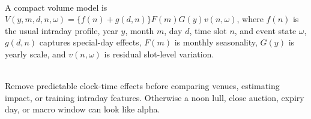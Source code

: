 \begin{model} \\
A compact volume model is $V(y,m,d,n,\omega)=\{f(n)+g(d,n)\}F(m)G(y)v(n,\omega)$, where 
$f(n)$ is the usual intraday profile, year $y$, month $m$, day $d$, time slot $n$, and event state $\omega$, $g(d,n)$ captures special-day effects, $F(m)$ is monthly seasonality, $G(y)$ is yearly scale, and $v(n,\omega)$ is residual slot-level variation.
\end{model}

\begin{practitionernote} \\
Remove predictable clock-time effects before comparing venues, estimating impact, or training intraday features. Otherwise a noon lull, close auction, expiry day, or macro window can look like alpha.
\end{practitionernote}
